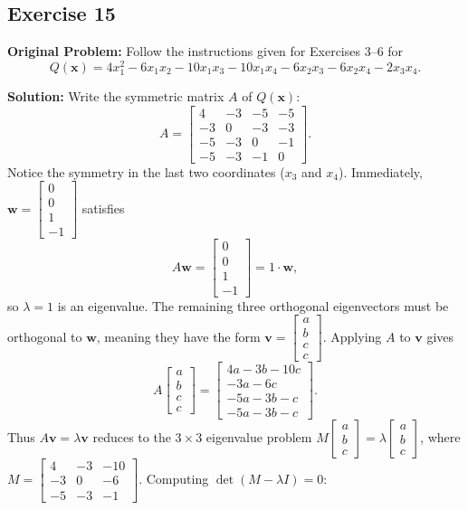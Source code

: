 \documentclass[11pt, letterpaper]{article}
\theoremstyle{definition}
\theoremstyle{remark}
\begin{document}
\subsection{Exercise 15}
\textbf{Original Problem:} Follow the instructions given for Exercises 3–6 for
\[
Q(\mathbf{x}) = 4x_1^2 - 6x_1x_2 - 10x_1x_3 - 10x_1x_4 - 6x_2x_3 - 6x_2x_4 - 2x_3x_4.
\]

\textbf{Solution:}
Write the symmetric matrix $A$ of $Q(\mathbf{x})$:
\[
A = \begin{bmatrix} 4 & -3 & -5 & -5 \\ -3 & 0 & -3 & -3 \\ -5 & -3 & 0 & -1 \\ -5 & -3 & -1 & 0 \end{bmatrix}.
\]
Notice the symmetry in the last two coordinates ($x_3$ and $x_4$). Immediately, $\mathbf{w} = \begin{bmatrix} 0 \\ 0 \\ 1 \\ -1 \end{bmatrix}$ satisfies
\[
A\mathbf{w} = \begin{bmatrix} 0 \\ 0 \\ 1 \\ -1 \end{bmatrix} = 1\cdot\mathbf{w},
\]
so $\lambda = 1$ is an eigenvalue. The remaining three orthogonal eigenvectors must be orthogonal to $\mathbf{w}$, meaning they have the form $\mathbf{v} = \begin{bmatrix} a \\ b \\ c \\ c \end{bmatrix}$. Applying $A$ to $\mathbf{v}$ gives
\[
A\begin{bmatrix} a \\ b \\ c \\ c \end{bmatrix} = \begin{bmatrix} 4a - 3b - 10c \\ -3a - 6c \\ -5a - 3b - c \\ -5a - 3b - c \end{bmatrix}.
\]
Thus $A\mathbf{v} = \lambda \mathbf{v}$ reduces to the $3 \times 3$ eigenvalue problem $M\begin{bmatrix} a \\ b \\ c \end{bmatrix} = \lambda \begin{bmatrix} a \\ b \\ c \end{bmatrix}$, where $M = \begin{bmatrix} 4 & -3 & -10 \\ -3 & 0 & -6 \\ -5 & -3 & -1 \end{bmatrix}$. Computing $\det(M - \lambda I) = 0$:
\end{document}
